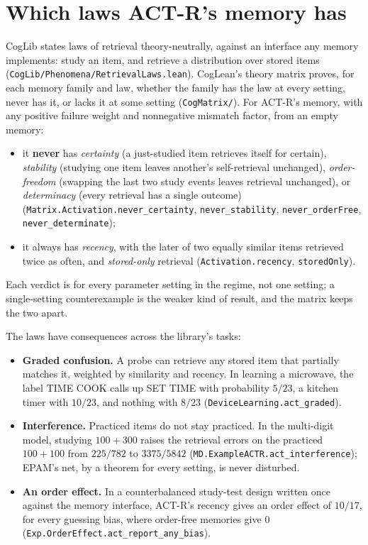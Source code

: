 \documentclass[11pt]{article}
\newcommand{\code}[1]{\texttt{#1}}
\newcommand{\lean}[1]{\texttt{#1}}
\begin{document}
\section{Which laws ACT-R's memory has}
\label{sec:laws}

CogLib states laws of retrieval theory-neutrally, against an interface any memory implements: study an item, and retrieve a distribution over stored items (\code{CogLib/Phenomena/RetrievalLaws.lean}). CogLean's theory matrix proves, for each memory family and law, whether the family has the law at every setting, never has it, or lacks it at some setting (\code{CogMatrix/}). For ACT-R's memory, with any positive failure weight and nonnegative mismatch factor, from an empty memory:
\begin{itemize}
  \item it \textbf{never} has \emph{certainty} (a just-studied item retrieves itself for certain), \emph{stability} (studying one item leaves another's self-retrieval unchanged), \emph{order-freedom} (swapping the last two study events leaves retrieval unchanged), or \emph{determinacy} (every retrieval has a single outcome) (\lean{Matrix.Activation.never\_certainty}, \lean{never\_stability}, \lean{never\_orderFree}, \lean{never\_determinate});
  \item it always has \emph{recency}, with the later of two equally similar items retrieved twice as often, and \emph{stored-only} retrieval (\lean{Activation.recency}, \lean{storedOnly}).
\end{itemize}
Each verdict is for every parameter setting in the regime, not one setting; a single-setting counterexample is the weaker kind of result, and the matrix keeps the two apart.

The laws have consequences across the library's tasks:
\begin{itemize}
  \item \textbf{Graded confusion.} A probe can retrieve any stored item that partially matches it, weighted by similarity and recency. In learning a microwave, the label TIME COOK calls up SET TIME with probability $5/23$, a kitchen timer with $10/23$, and nothing with $8/23$ (\lean{DeviceLearning.act\_graded}).
  \item \textbf{Interference.} Practiced items do not stay practiced. In the multi-digit model, studying $100+300$ raises the retrieval errors on the practiced $100+100$ from $225/782$ to $3375/5842$ (\lean{MD.ExampleACTR.act\_interference}); EPAM's net, by a theorem for every setting, is never disturbed.
  \item \textbf{An order effect.} In a counterbalanced study-test design written once against the memory interface, ACT-R's recency gives an order effect of $10/17$, for every guessing bias, where order-free memories give 0 (\lean{Exp.OrderEffect.act\_report\_any\_bias}).
\end{itemize}
\end{document}
